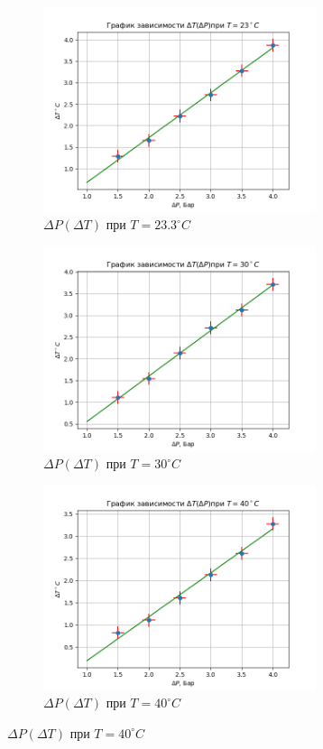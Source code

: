 \begin{figure}
    \centering
    \begin{subfigure}{0.45\linewidth}
        \includegraphics[width=8cm]{plot1.png}
        \caption{$\Delta P(\Delta T)$ при $T = 23.3^\circ C$}
    \end{subfigure}
    \begin{subfigure}{0.45\linewidth}
        \includegraphics[width=8cm]{plot2.png} 
        \caption{$\Delta P(\Delta T)$ при $T = 30^\circ C$}
    \end{subfigure}
    \vfill
    \begin{subfigure}{0.45\linewidth}
        \includegraphics[width=8cm]{plot3.png} 
        \caption{$\Delta P(\Delta T)$ при $T = 40^\circ C$}
    \end{subfigure}

\end{figure}
